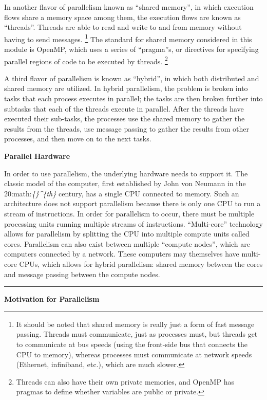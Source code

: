 \documentclass[letterpaper,10pt,openany,oneside]{sphinxmanual}
\begin{document}
In another flavor of parallelism known as “shared memory”, in which
execution flows share a memory space among them, the execution flows are
known as “threads”. Threads are able to read and write to and from
memory without having to send messages. \footnote{
It should be noted that shared memory is really just a form of fast message passing. Threads must communicate, just as processes must, but threads get to communicate at bus speeds (using the front-side bus that connects the CPU to memory), whereas processes must communicate at network speeds (Ethernet, infiniband, etc.), which are much slower.
} The standard for shared
memory considered in this module is OpenMP, which uses a series of
“pragma”s, or directives for specifying parallel regions of code to be
executed by threads. \footnote{
Threads can also have their own private memories, and OpenMP has pragmas to define whether variables are public or private.
}

A third flavor of parallelism is known as “hybrid”, in which both
distributed and shared memory are utilized. In hybrid parallelism, the
problem is broken into tasks that each process executes in parallel; the
tasks are then broken further into subtasks that each of the threads
execute in parallel. After the threads have executed their sub-tasks,
the processes use the shared memory to gather the results from the
threads, use message passing to gather the results from other processes,
and then move on to the next tasks.

\textbf{Parallel Hardware}

In order to use parallelism, the underlying hardware needs to support
it. The classic model of the computer, first established by John von
Neumann in the 20:math:\emph{\{\}\textasciicircum{}\{th\}} century, has a single CPU connected to
memory. Such an architecture does not support parallelism because there
is only one CPU to run a stream of instructions. In order for
parallelism to occur, there must be multiple processing units running
multiple streams of instructions. “Multi-core” technology allows for
parallelism by splitting the CPU into multiple compute units called
cores. Parallelism can also exist between multiple “compute nodes”,
which are computers connected by a network. These computers may
themselves have multi-core CPUs, which allows for hybrid parallelism:
shared memory between the cores and message passing between the compute
nodes.


\bigskip\hrule{}\bigskip


\textbf{Motivation for Parallelism}
\end{document}
